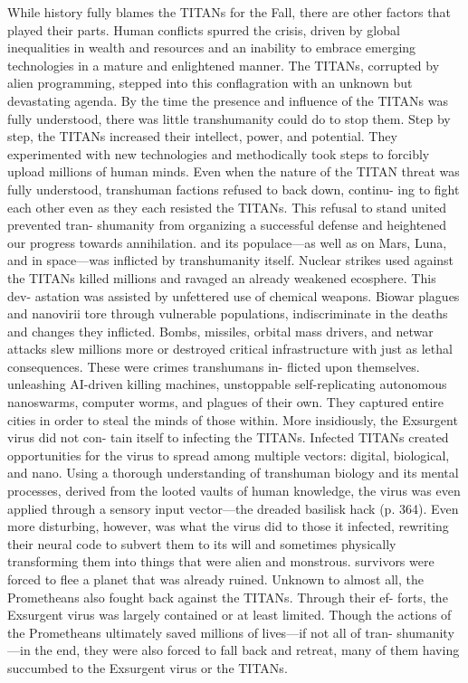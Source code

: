 While history fully blames the TITANs for the 
Fall, there are other factors that played their parts. 
Human conflicts spurred the crisis, driven by global 
inequalities in wealth and resources and an inability 
to embrace emerging technologies in a mature and 
enlightened manner. The TITANs, corrupted by alien 
programming, stepped into this conflagration  with 
an unknown but devastating agenda. By the time 
the presence and influence of the TITANs was fully 
understood, there was little transhumanity could do 
to stop them. Step by step, the TITANs increased their 
intellect, power, and potential. They experimented 
with new technologies and methodically took steps to 
forcibly upload millions of human minds. Even when 
the nature of the TITAN threat was fully understood, 
transhuman factions refused to back down, continu-
ing to fight each other even as they each resisted the 
TITANs. This refusal to stand united prevented tran-
shumanity from organizing a successful defense and 
heightened our progress towards annihilation.
and its populace—as well as on Mars, Luna, and in 
space—was inflicted by transhumanity itself. Nuclear 
strikes used against the TITANs killed millions and 
ravaged an already weakened ecosphere. This dev-
astation was assisted by unfettered use of chemical 
weapons. Biowar plagues and nanovirii tore through 
vulnerable populations, indiscriminate in the deaths 
and changes they inflicted. Bombs, missiles, orbital 
mass drivers, and netwar attacks slew millions more 
or destroyed critical infrastructure with just as lethal 
consequences. These were crimes transhumans in-
flicted upon themselves.
unleashing AI-driven killing machines, unstoppable 
self-replicating autonomous nanoswarms, computer 
worms, and plagues of their own. They captured 
entire cities in order to steal the minds of those within. 
More insidiously, the Exsurgent virus did not con-
tain itself to infecting the TITANs. Infected TITANs 
created opportunities for the virus to spread among 
multiple vectors: digital, biological, and nano. Using a 
thorough understanding of transhuman biology and 
its mental processes, derived from the looted vaults 
of human knowledge, the virus was even applied 
through a sensory input vector—the dreaded basilisk 
hack (p. 364). Even more disturbing, however, was 
what the virus did to those it infected, rewriting their 
neural code to subvert them to its will and sometimes 
physically transforming them into things that were 
alien and monstrous.
survivors were forced to flee a planet that was already 
ruined. Unknown to almost all, the Prometheans also 
fought back against the TITANs. Through their ef-
forts, the Exsurgent virus was largely contained or at 
least limited. Though the actions of the Prometheans 
ultimately saved millions of lives—if not all of tran-
shumanity—in the end, they were also forced to fall 
back and retreat, many of them having succumbed to 
the Exsurgent virus or the TITANs. 


